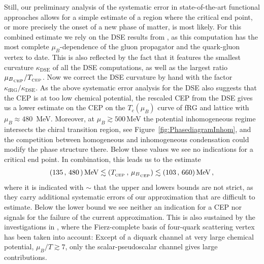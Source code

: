 \documentclass[%
reprint,
superscriptaddress,
showpacs,preprintnumbers,
 amsmath,amssymb,
 aps,
prd,
]{revtex4-1}
\def\fig#1{Figure~\ref{#1}}
\begin{document}
Still, our preliminary analysis of the systematic error in
state-of-the-art functional approaches allows for a simple estimate of
a region where the critical end point, or more precisely the onset of
a new phase of matter, is most likely. For this combined estimate we
rely on the DSE results from \cite{Fischer:2014ata}, as this
computation has the most complete $\mu_B$-dependence of the gluon
propagator and the quark-gluon vertex to date. This is also reflected
by the fact that it features the smallest curvature
$\kappa_\textrm{DSE}$ of all the DSE computations, as well as the
largest ratio
$ {\mu_B}_{_{\tiny{\text{CEP}}}} / T_{_{\tiny{\text{CEP}}}}$. Now we
correct the DSE curvature by hand with the factor
$\kappa_\textrm{fRG}/\kappa_\textrm{DSE}$. As the above systematic
error analysis for the DSE also suggests that the CEP is at too low
chemical potential, the rescaled CEP from the DSE gives us a lower
estimate on the CEP on the $T_c(\mu_B)$ curve of fRG and lattice with
$\mu_B\approx 480$\, MeV. Moreover, at $\mu_B \gtrsim 500$\,MeV the
potential inhomogeneous regime intersects the chiral transition
region, see \fig{fig:PhasediagramInhom}, and the competition between
homogeneous and inhomogeneous condensation could modify the phase
structure there. Below these values we see no indications for a
critical end point. In combination, this leads us to the estimate
%
\begin{align}\label{eq:EducatedGuess}
  (135\,,\, 480\, )\,\textrm{MeV}\lesssim
  (  {T}_{_{\tiny{\text{CEP}}}}\,,\,{\mu_B}_{_{\tiny{\text{CEP}}}})
  \lesssim  ( 103\,,\, 660)\,\textrm{MeV} \,, 
\end{align}
%
where it is indicated with $\sim$ that the upper and lowers bounds are
not strict, as they carry additional systematic errors of our
approximation that are difficult to estimate.  Below the lower bound
we see neither an indication for a CEP nor signals for the failure of
the current approximation. This is also sustained by the
investigations in \cite{Braun:2017srn, Braun:2018bik, Braun:2019a},
where the Fierz-complete basis of four-quark scattering vertex has
been taken into account: Except of a diquark channel at very large
chemical potential, $\mu_B/T\gtrsim 7$, only the scalar-pseudoscalar
channel gives large contributions.
\end{document}
